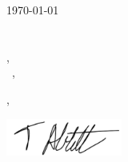 \documentclass[usenames, dvipsnames]{resume} %
\begin{document}
	
\today\\

\vspace{-0.1in}\recipient\\
\company\\
\city, \state\\

\vspace{-0.1in}\greeting\ \recipient,\\

\vspace{-0.1in}\setlength\parindent{24pt}
\noindent

\vspace{0.1in}
\vfill

\begin{flushright}
\closer,

\vspace{-0.1in}\includegraphics[width=1.5in]{signature.png}\vspace{-0.1in}

\myname\\
\mytitle
\end{flushright}
\end{document}
